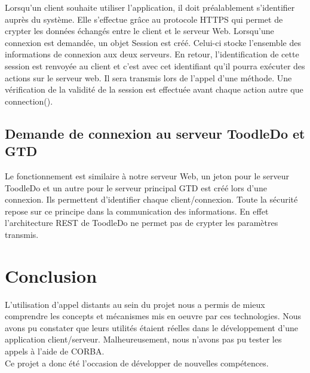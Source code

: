 Lorsqu'un client souhaite utiliser l'application, il doit préalablement s'identifier auprès du système. Elle s'effectue grâce au protocole HTTPS qui permet de crypter les données échangés entre le client et le serveur Web. 
\bigskip
Lorsqu'une connexion est demandée, un objet Session est créé. Celui-ci stocke l'ensemble des informations de connexion aux deux serveurs. En retour, l'identification de cette session est renvoyée au client et c'est avec cet identifiant qu'il pourra exécuter des actions sur le serveur web. Il sera transmis lors de l'appel d'une méthode. Une vérification de la validité de la session est effectuée avant chaque action autre que connection().

\section{Demande de connexion au serveur ToodleDo et GTD}

Le fonctionnement est similaire à notre serveur Web, un jeton pour le serveur ToodleDo et un autre pour le serveur principal GTD est créé lors d'une connexion. Ils permettent d'identifier chaque client/connexion. 
Toute la sécurité repose sur ce principe dans la communication des informations. En effet l'architecture REST de ToodleDo ne permet pas de crypter les paramètres transmis.

\chapter{Conclusion}

L'utilisation d'appel distants au sein du projet nous a permis de mieux comprendre les concepts et mécanismes mis en oeuvre par ces technologies. Nous avons pu constater que leurs utilités étaient réelles dans le développement d'une application client/serveur. Malheureusement, nous n'avons pas pu tester les appels à l'aide de CORBA.\\ Ce projet a donc été l'occasion de développer de nouvelles compétences.

